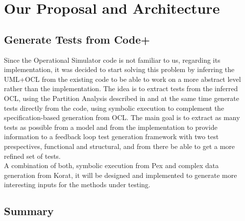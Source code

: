 \chapter{Our Proposal and Architecture}
\minitoc
{}

\section{Generate Tests from Code+}\label{proposal}
Since the Operational Simulator code is not familiar to us, regarding its implementation, it was decided to start solving this problem by inferring the \ac{UML}+\ac{OCL} from the existing code
to be able to work on a more abstract level rather than the implementation.
The idea is to extract tests from the inferred \ac{OCL}, using the Partition Analysis described
in \cite{Benattou02generatingtest} and at the same time generate tests directly from the code, using symbolic execution to complement
the specification-based generation from \ac{OCL}. The main goal is to extract as many tests as possible from a model and from the implementation 
to provide information to a feedback loop\cite{Xie03mutuallyenhancing}
test generation framework with two test prespectives, functional and structural, and from there be able to get a more refined set of tests.\\
A combination of both, symbolic execution from Pex and complex data generation from Korat, it will be designed and implemented to
generate more interesting inputs for the methods under testing.
\section{Summary}
\secendnote
